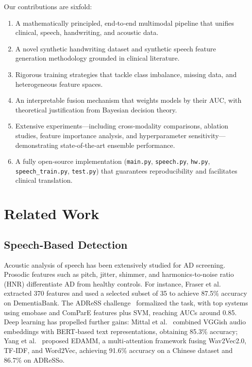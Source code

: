 \documentclass[conference]{IEEEtran}
\begin{document}
Our contributions are sixfold:
\begin{enumerate}[leftmargin=*]
    \item A mathematically principled, end‑to‑end multimodal pipeline that unifies clinical, speech, handwriting, and acoustic data.
    \item A novel synthetic handwriting dataset and synthetic speech feature generation methodology grounded in clinical literature.
    \item Rigorous training strategies that tackle class imbalance, missing data, and heterogeneous feature spaces.
    \item An interpretable fusion mechanism that weights models by their AUC, with theoretical justification from Bayesian decision theory.
    \item Extensive experiments—including cross‑modality comparisons, ablation studies, feature importance analysis, and hyperparameter sensitivity—demonstrating state‑of‑the‑art ensemble performance.
    \item A fully open‑source implementation (\texttt{main.py}, \texttt{speech.py}, \texttt{hw.py}, \texttt{speech\_train.py}, \texttt{test.py}) that guarantees reproducibility and facilitates clinical translation.
\end{enumerate}

\section{Related Work}
\subsection{Speech‑Based Detection}
Acoustic analysis of speech has been extensively studied for AD screening. Prosodic features such as pitch, jitter, shimmer, and harmonics‑to‑noise ratio (HNR) differentiate AD from healthy controls. For instance, Fraser et al.~\cite{fraser2016} extracted 370 features and used a selected subset of 35 to achieve 87.5\% accuracy on DementiaBank. The ADReSS challenge~\cite{luz2020adress} formalized the task, with top systems using emobase and ComParE features plus SVM, reaching AUCs around 0.85. Deep learning has propelled further gains: Mittal et al.~\cite{mittal2021} combined VGGish audio embeddings with BERT‑based text representations, obtaining 85.3\% accuracy; Yang et al.~\cite{yang2024} proposed EDAMM, a multi‑attention framework fusing Wav2Vec2.0, TF‑IDF, and Word2Vec, achieving 91.6\% accuracy on a Chinese dataset and 86.7\% on ADReSSo.
\end{document}
